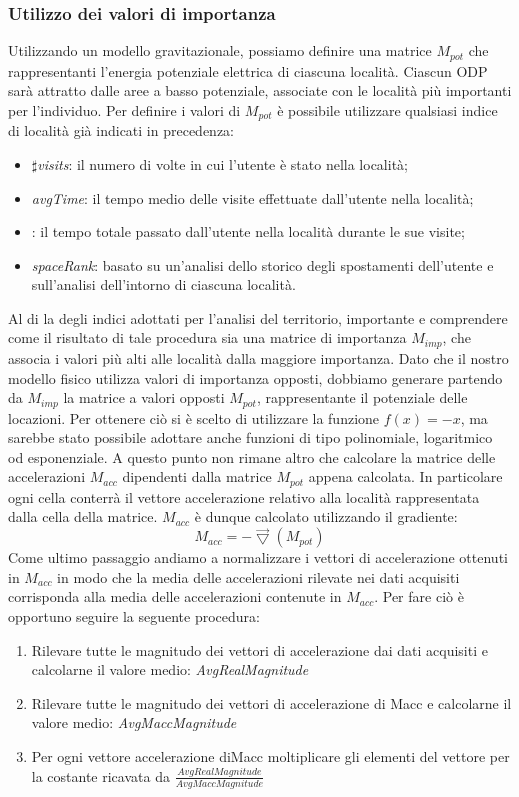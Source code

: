 \subsubsection{Utilizzo dei valori di importanza}
Utilizzando un modello gravitazionale, possiamo definire una matrice $M_{pot}$ che
rappresentanti l'energia potenziale elettrica di ciascuna localit\`a. Ciascun ODP
sar\`a attratto dalle aree a basso potenziale, associate con le localit\`a pi\`u
importanti per l'individuo.
Per definire i valori di $M_{pot}$ \`e possibile utilizzare qualsiasi indice di
localit\`a gi\`a indicati in precedenza:
\begin{itemize}
\item $\sharp$\textit{visits}: il numero di volte in cui l'utente \`e stato nella localit\`a;
\item \textit{avgTime}: il tempo medio delle visite effettuate dall'utente nella localit\`a;
\item {}: il tempo totale passato dall'utente nella localit\`a durante le sue
visite;
\item \textit{spaceRank}: basato su un'analisi dello storico degli spostamenti dell'utente
e sull'analisi dell'intorno di ciascuna localit\`a.
\end{itemize}
Al di la degli indici adottati per l'analisi del territorio, importante e comprendere
come il risultato di tale procedura sia una matrice di importanza
$M_{imp}$, che associa i valori pi\`u alti alle localit\`a dalla maggiore importanza.
Dato che il nostro modello fisico utilizza valori di importanza opposti, dobbiamo
generare partendo da $M_{imp}$ la matrice a valori opposti $M_{pot}$, rappresentante il
potenziale delle locazioni. Per ottenere ci\`o si \`e scelto di utilizzare la funzione
$f(x)=-x$, ma sarebbe stato possibile adottare anche funzioni di tipo
polinomiale, logaritmico od esponenziale. A questo punto non rimane altro che
calcolare la matrice delle accelerazioni $M_{acc}$ dipendenti dalla matrice $M_{pot}$
appena calcolata. In particolare ogni cella conterr\`a il vettore accelerazione relativo
alla localit\`a rappresentata dalla cella della matrice. $M_{acc}$ \`e dunque calcolato
utilizzando il gradiente:
\begin{equation}
M_{acc} = - \vec{\bigtriangledown}(M_{pot})
\end{equation}
Come ultimo passaggio andiamo a normalizzare i vettori di accelerazione ottenuti in $M_{acc}$
in modo che la media delle accelerazioni rilevate nei dati acquisiti corrisponda
alla media delle accelerazioni contenute in $M_{acc}$.
Per fare ci\`o \`e opportuno seguire la seguente procedura:
\begin{enumerate}
\item Rilevare tutte le magnitudo dei vettori di accelerazione dai dati acquisiti
e calcolarne il valore medio: \textit{AvgRealMagnitude}
\item Rilevare tutte le magnitudo dei vettori di accelerazione di Macc e calcolarne
il valore medio: \textit{AvgMaccMagnitude}
\item Per ogni vettore accelerazione diMacc moltiplicare gli elementi del vettore
per la costante ricavata da $\frac{AvgRealMagnitude}{AvgMaccMagnitude}$
\end{enumerate}


